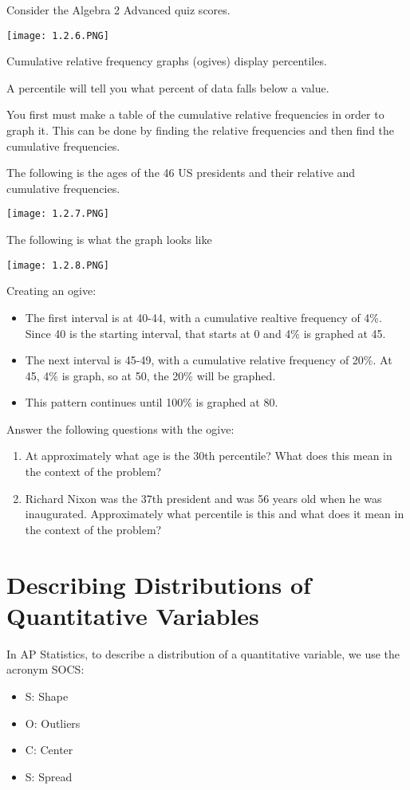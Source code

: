 \documentclass[../stats.tex]{subfiles}
\begin{document}
Consider the Algebra 2 Advanced quiz scores.
\begin{center}
    \texttt{[image: 1.2.6.PNG]}
\end{center}

Cumulative relative frequency graphs (ogives) display percentiles.

A percentile will tell you what percent of data falls below a value.

You first must make a table of the cumulative relative frequencies in order to graph it. This can be done by finding the relative frequencies and then find the cumulative frequencies. 

The following is the ages of the 46 US presidents and their relative and cumulative frequencies.
\begin{center}
    \texttt{[image: 1.2.7.PNG]}
\end{center}

The following is what the graph looks like 
\begin{center}
    \texttt{[image: 1.2.8.PNG]}
\end{center}
Creating an ogive:
\begin{itemize}
    \item The first interval is at 40-44, with a cumulative realtive frequency of 4\%. Since 40 is the starting interval, that starts at 0 and 4\% is graphed at 45.
    \item The next interval is 45-49, with a cumulative relative frequency of 20\%. At 45, 4\% is graph, so at 50, the 20\% will be graphed.
    \item This pattern continues until 100\% is graphed at 80.
\end{itemize}

Answer the following questions with the ogive:
\begin{enumerate}
    \item At approximately what age is the 30th percentile? What does this mean in the context of the problem?
    \item Richard Nixon was the 37th president and was 56 years old when he was inaugurated. Approximately what percentile is this and what does it mean in the context of the problem? 
\end{enumerate}

\section{Describing Distributions of Quantitative Variables}
In AP Statistics, to describe a distribution of a quantitative variable, we use the acronym SOCS:
\begin{itemize}
    \item S: Shape 
    \item O: Outliers 
    \item C: Center 
    \item S: Spread
\end{itemize}
\end{document}
